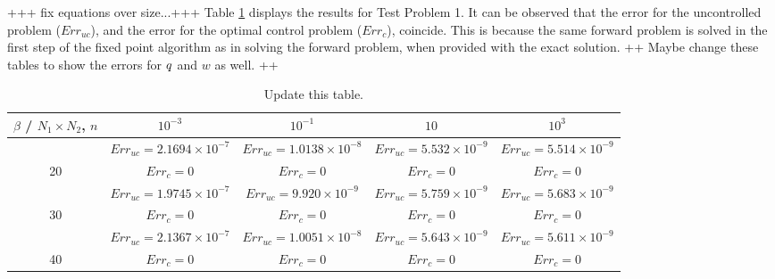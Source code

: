 +++ fix equations over size...+++
Table \ref{TabApp1} displays the results for Test Problem 1. It can be observed that the error for the uncontrolled problem ($Err_{uc}$), and the error for the optimal control problem ($Err_c$), coincide. This is because the same forward problem is solved in the first step of the fixed point algorithm as in solving the forward problem, when provided with the exact solution. 
++ Maybe change these tables to show the errors for $q$ and $w$ as well. ++


\begin{table}
	\begin{tabular}{ ||c|| c | c |c | c ||}
		\hline
		$\beta$ / $N_1 \times N_2$, $n$ & $10^{-3}$  & $10^{-1}$  & $10$ & $10^3$ \\ 
		\hline 
		&$Err_{uc} = 2.1694\times 10^{-7}$ &$Err_{uc} = 1.0138\times 10^{-8}$ &$Err_{uc} = 5.532\times 10^{-9}$ &$Err_{uc} = 5.514\times 10^{-9}$\\
		20    &$Err_{c} = 0$ &$Err_{c} = 0$ &$Err_{c} = 0$ &$Err_{c} = 0$\\
		\hline 
		&$Err_{uc} =1.9745 \times 10^{-7}$ &$Err_{uc} =9.920\times 10^{-9}$ &$Err_{uc} = 5.759\times 10^{-9}$ &$Err_{uc} = 5.683 \times 10^{-9}$\\
		30     &$Err_{c} =0$ &$Err_{c} = 0$ &$Err_{c} = 0$ &$Err_{c} = 0$\\
		\hline 
		&$Err_{uc} = 2.1367\times 10^{-7}$ &$Err_{uc} = 1.0051\times 10^{-8}$ &$Err_{uc} = 5.643\times 10^{-9}$ &$Err_{uc} = 5.611\times 10^{-9}$\\
		40     &$Err_{c} = 0$ &$Err_{c} = 0$ &$Err_{c} = 0$ &$Err_{c} = 0$\\
		\hline 
	\end{tabular}
	\caption{Update this table.}
	\label{TabApp1}
\end{table}




\vspace{0.75em}


